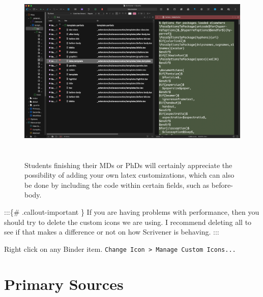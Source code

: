 \documentclass[
  12pt,
  a4paper,
  oneside,
  titlepage,
  toclink=all,
  toc=bibliography]{scrbook}
\theoremstyle{plain}
\theoremstyle{plain}
\theoremstyle{definition}
\theoremstyle{definition}
\theoremstyle{plain}
\theoremstyle{plain}
\theoremstyle{plain}
\theoremstyle{definition}
\theoremstyle{remark}
\begin{document}
\begin{figure}

{\centering \includegraphics[width=5.69792in,height=3.5625in]{pandocquartolatextemplate.png}

}

\caption{\label{fig-scriv203}Students finishing their MDs or PhDs will
certainly appreciate the possibility of adding your own latex
customizations, which can also be done by including the code within
certain fields, such as before-body.}

\end{figure}

:::\{\# .callout-important \} If you are having problems with
performance, then you should try to delete the custom icons we are
using. I recommend deleting all to see if that makes a difference or not
on how Scrivener is behaving. :::

\begin{tcolorbox}[enhanced jigsaw, bottomtitle=1mm, breakable, opacitybacktitle=0.6, colframe=quarto-callout-tip-color-frame, colback=white, colbacktitle=quarto-callout-tip-color!10!white, leftrule=.75mm, left=2mm, toprule=.15mm, opacityback=0, titlerule=0mm, bottomrule=.15mm, toptitle=1mm, arc=.35mm, title=\textcolor{quarto-callout-tip-color}{\faLightbulb}\hspace{0.5em}{Tip}, rightrule=.15mm, coltitle=black]

Right click on any Binder item.
\texttt{Change\ Icon\ \textgreater{}\ Manage\ Custom\ Icons...}

\end{tcolorbox}

\hypertarget{sec-scriv206}{%
\chapter{Primary Sources}\label{sec-scriv206}}
\end{document}
